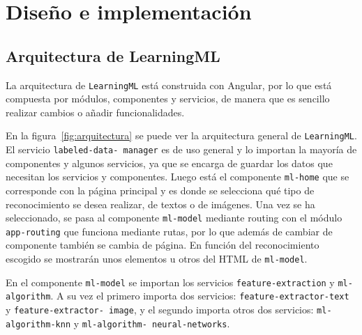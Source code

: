 \documentclass[a4paper, 12pt]{book}
\begin{document}
\cleardoublepage
\chapter{Diseño e implementación} 

\section{Arquitectura de LearningML} 
\label{sec:arquitectura}

La arquitectura de \texttt{LearningML} está construida con Angular, por lo que está compuesta por módulos, componentes y servicios, de manera que es sencillo realizar cambios o añadir funcionalidades. 

En la figura~\ref{fig:arquitectura} se puede ver la arquitectura general de \texttt{LearningML}. El servicio \texttt{labeled-data-
manager} es de uso general y lo importan la mayoría de componentes y algunos servicios, ya que se encarga de guardar los datos que necesitan los servicios y componentes. 
Luego está el componente \texttt{ml-home} que se corresponde con la página principal y es donde se selecciona qué tipo de reconocimiento se desea realizar, de textos o de imágenes. Una vez se ha seleccionado, se pasa al componente \texttt{ml-model} mediante routing con el módulo \texttt{app-routing} que funciona mediante rutas, por lo que además de cambiar de componente también se cambia de página. 
En función del reconocimiento escogido se mostrarán unos elementos u otros del HTML de \texttt{ml-model}.

En el componente \texttt{ml-model} se importan los servicios \texttt{feature-extraction} y \texttt{ml-algorithm}. A su vez el primero importa dos servicios: \texttt{feature-extractor-text} y \texttt{feature-extractor-
image}, y el segundo importa otros dos servicios: \texttt{ml-algorithm-knn} y \texttt{ml-algorithm-
neural-networks}.
\end{document}
